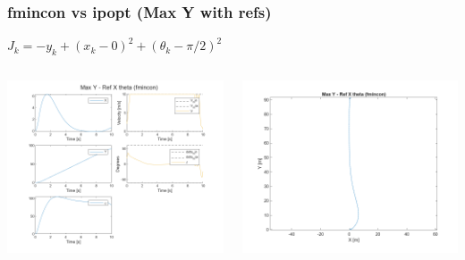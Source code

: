 \documentclass[aspectratio=169]{beamer}
\begin{document}
\begin{frame}
	\frametitle{fmincon vs ipopt (Max Y with refs)}
	$J_k = -y_k + (x_k - 0)^2 + (\theta_k - \pi/2)^2$
	\begin{columns}
		\begin{column}{0.4\textwidth}
			\includegraphics[width = \columnwidth]{figs/Max_Y_-_Ref_X_theta_(fmincon)_traj.png}
		\end{column}
		\begin{column}{0.25\textwidth}
			\includegraphics[width = \columnwidth]{figs/Max_Y_-_Ref_X_theta_(fmincon)_quiver.png}

\end{column}
\end{columns}
\end{frame}
\end{document}

